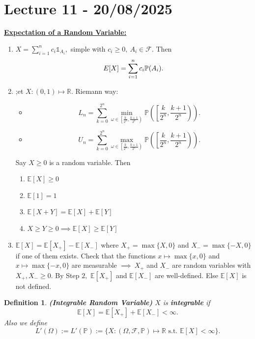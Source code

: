 \documentclass{article}
\newcommand{\1}{\mathds{1}}
\newcommand{\R}{\mathbb{R}}
\newcommand{\E}{\mathbb{E}}
\newcommand{\F}{\mathcal{F}}
\newcommand{\PB}{\mathbb{P}}
\newcommand{\lf}{\left}
\newcommand{\rg}{\right}
\newcommand{\f}[2]{\frac{#1}{#2}}
\newcommand{\st}{\text{ s.t. }}
\newcommand{\fb}[1]{\lf(#1\rg)}
\newtheorem{definition}[theorem]{Definition}
\begin{document}
\section{Lecture 11 - 20/08/2025}
\textbf{\underline{Expectation of a Random Variable: }} 
\begin{enumerate}
    \item[Step 1:] $X=\sum_{i=1}^nc_i\1_{A_i},$ simple with $c_i\geq 0,\ A_i\in\F.$ Then $$\\E[X]=\sum_{i=1}^nc_i\PB(A_i).$$ 
    \item[Step 2:] ;et $X:(0,1)\mapsto \R.$ Riemann way:
    \begin{itemize}
        \item $$L_n=\sum_{k=0}^{2^n}\min_{\omega\in\lf[\f k{2^n},\f{k+1}{2^n}\rg)}\PB\fb{\lf[\f k{2^n},\f{k+1}{2^n}\rg)}.$$
        \item $$U_n=\sum_{k=0}^{2^n}\max_{\omega\in\lf[\f k{2^n},\f{k+1}{2^n}\rg)}\PB\fb{\lf[\f k{2^n},\f{k+1}{2^n}\rg)}.$$
    \end{itemize}
     Say $X\geq 0$ is a random variable. Then
    \begin{enumerate}
        \item $\E[X]\geq 0$
        \item $\E[1]=1$
        \item $\E[X+Y]=\E[X]+\E[Y]$
        \item $X\geq Y\geq 0\implies \E[X]\geq \E[Y]$
    \end{enumerate}
    \item[Step 3:] $\E[X]=\E[X_+]-\E[X_-]$ where $X_+=\max\{X,0\}$ and $X_-=\max\{-X,0\}$ if one of them exists. Check that the functions $x\mapsto \max\{x,0\}$ and $x\mapsto \max\{-x,0\}$ are measurable $\implies\ X_+$ and $X_-$ are random variables with $X_+,X_-\geq 0.$ By Step $2,$ $\E[X_+]$ and $\E[X_-]$ are well-defined. Else $\E[X]$ is not defined.
\end{enumerate}
\begin{definition}\textbf{(Integrable Random Variable)}
    $X$ is \textbf{integrable} if $$\E[X]=\E[X_+]+\E[X_-]<\infty.$$ Also we define
    $$L'(\Omega):=L'(\PB):=\{X:(\Omega,\F,\PB)\mapsto \R\st \E[X]<\infty\}.$$
\end{definition}
\end{document}
